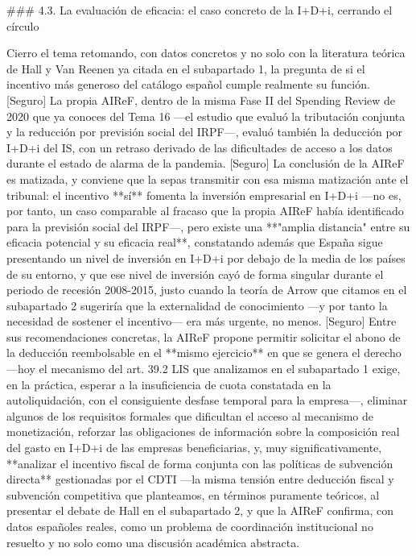\documentclass[10pt,a4paper]{article}
\begin{document}
### 4.3. La evaluación de eficacia: el caso concreto de la I+D+i, cerrando el círculo

Cierro el tema retomando, con datos concretos y no solo con la literatura teórica de Hall y Van Reenen ya citada en el subapartado 1, la pregunta de si el incentivo más generoso del catálogo español cumple realmente su función. [Seguro] La propia AIReF, dentro de la misma Fase II del Spending Review de 2020 que ya conoces del Tema 16 —el estudio que evaluó la tributación conjunta y la reducción por previsión social del IRPF—, evaluó también la deducción por I+D+i del IS, con un retraso derivado de las dificultades de acceso a los datos durante el estado de alarma de la pandemia. [Seguro] La conclusión de la AIReF es matizada, y conviene que la sepas transmitir con esa misma matización ante el tribunal: el incentivo **sí** fomenta la inversión empresarial en I+D+i —no es, por tanto, un caso comparable al fracaso que la propia AIReF había identificado para la previsión social del IRPF—, pero existe una **"amplia distancia" entre su eficacia potencial y su eficacia real**, constatando además que España sigue presentando un nivel de inversión en I+D+i por debajo de la media de los países de su entorno, y que ese nivel de inversión cayó de forma singular durante el periodo de recesión 2008-2015, justo cuando la teoría de Arrow que citamos en el subapartado 2 sugeriría que la externalidad de conocimiento —y por tanto la necesidad de sostener el incentivo— era más urgente, no menos. [Seguro] Entre sus recomendaciones concretas, la AIReF propone permitir solicitar el abono de la deducción reembolsable en el **mismo ejercicio** en que se genera el derecho —hoy el mecanismo del art. 39.2 LIS que analizamos en el subapartado 1 exige, en la práctica, esperar a la insuficiencia de cuota constatada en la autoliquidación, con el consiguiente desfase temporal para la empresa—, eliminar algunos de los requisitos formales que dificultan el acceso al mecanismo de monetización, reforzar las obligaciones de información sobre la composición real del gasto en I+D+i de las empresas beneficiarias, y, muy significativamente, **analizar el incentivo fiscal de forma conjunta con las políticas de subvención directa** gestionadas por el CDTI —la misma tensión entre deducción fiscal y subvención competitiva que planteamos, en términos puramente teóricos, al presentar el debate de Hall en el subapartado 2, y que la AIReF confirma, con datos españoles reales, como un problema de coordinación institucional no resuelto y no solo como una discusión académica abstracta.
\end{document}

